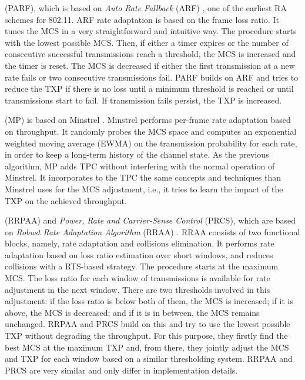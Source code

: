\documentclass[twoside,nohyper]{tufte-book}
\providecommand{\tightlist}{%
  \setlength{\itemsep}{0pt}\setlength{\parskip}{0pt}}
\theoremstyle{definition}
\theoremstyle{definition}
\theoremstyle{definition}
\theoremstyle{remark}
\begin{document}
\begin{description}
\tightlist
\item[Power-controlled Auto Rate Fallback]
(PARF),\cite[0pt]{Akella:2005}
which is based on \emph{Auto Rate Fallback} (ARF)
\citep{kamerman1997wavelan}, one of the earliest RA schemes for 802.11.
ARF rate adaptation is based on the frame loss ratio. It tunes the MCS
in a very straightforward and intuitive way. The procedure starts with
the lowest possible MCS. Then, if either a timer expires or the number
of consecutive successful transmissions reach a threshold, the MCS is
increased and the timer is reset. The MCS is decreased if either the
first transmission at a new rate fails or two consecutive transmissions
fail. PARF builds on ARF and tries to reduce the TXP if there is no loss
until a minimum threshold is reached or until transmissions start to
fail. If transmission fails persist, the TXP is increased.
\item[Minstrel-Piano]
(MP)\cite[0pt]{huehn2012}
is based on Minstrel \citep{minstrel}. Minstrel performs per-frame rate
adaptation based on throughput. It randomly probes the MCS space and
computes an exponential weighted moving average (EWMA) on the
transmission probability for each rate, in order to keep a long-term
history of the channel state. As the previous algorithm, MP adds TPC
without interfering with the normal operation of Minstrel. It
incorporates to the TPC the same concepts and techniques than Minstrel
uses for the MCS adjustment, i.e., it tries to learn the impact of the
TXP on the achieved throughput.
\item[Robust Rate and Power Adaptation Algorithm]
(RRPAA) and \emph{Power, Rate and Carrier-Sense Control}
(PRCS),\cite[0pt]{richart2015}
which are based on \emph{Robust Rate Adaptation Algorithm} (RRAA)
\citep{Wong2006}. RRAA consists of two functional blocks, namely, rate
adaptation and collisions elimination. It performs rate adaptation based
on loss ratio estimation over short windows, and reduces collisions with
a RTS-based strategy. The procedure starts at the maximum MCS. The loss
ratio for each window of transmissions is available for rate adjustment
in the next window. There are two thresholds involved in this
adjustment: if the loss ratio is below both of them, the MCS is
increased; if it is above, the MCS is decreased; and if it is in
between, the MCS remains unchanged. RRPAA and PRCS build on this and try
to use the lowest possible TXP without degrading the throughput. For
this purpose, they firstly find the best MCS at the maximum TXP and,
from there, they jointly adjust the MCS and TXP for each window based on
a similar thresholding system. RRPAA and PRCS are very similar and only
differ in implementation details.
\end{description}
\end{document}

